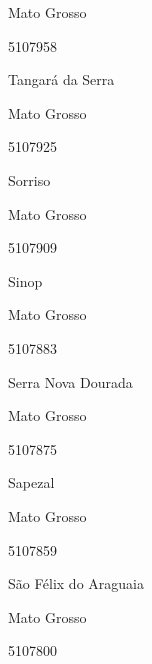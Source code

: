 \documentclass[
  letterpaper,
]{report}
\begin{document}
\n      

Mato Grosso

\n      

5107958

\n      

Tangará da Serra

\n    

\n    

\n      

Mato Grosso

\n      

5107925

\n      

Sorriso

\n    

\n    

\n      

Mato Grosso

\n      

5107909

\n      

Sinop

\n    

\n    

\n      

Mato Grosso

\n      

5107883

\n      

Serra Nova Dourada

\n    

\n    

\n      

Mato Grosso

\n      

5107875

\n      

Sapezal

\n    

\n    

\n      

Mato Grosso

\n      

5107859

\n      

São Félix do Araguaia

\n    

\n    

\n      

Mato Grosso

\n      

5107800
\end{document}
